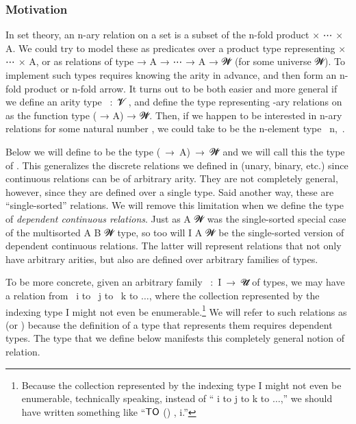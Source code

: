 \subsubsection*{Motivation} %
In set theory, an \ab n-ary relation on a set  is a subset of the \ab n-fold product  \ad × \as ⋯ \ad × \ab A. We could try to model these as predicates over a product type representing  \ad × \as ⋯ \ad × \ab A, or as relations of type  \as → \ab A \as → \as ⋯ \as → \ab A \as → \ab 𝓦\af ̇ (for some universe \ab 𝓦). To implement such types requires knowing the arity in advance, and then form an \ab n-fold product or \ab n-fold arrow. It turns out to be both easier and more general if we define an arity type ~\as :~\ab 𝓥\af ̇ , and define the type representing -ary relations on  as the function type ( \as → \ab A) \as → \ab 𝓦\af ̇. Then, if we happen to be interested in \ab n-ary relations for some natural number , we could take  to be the \ab n-element type ~\ab n,~\cite{agda-fin}.

Below we will define  to be the type (~\as →~\ab A)~\as →~\ab 𝓦\af ̇ and we will call this the type of . This generalizes the discrete relations we defined in  (unary, binary, etc.) since continuous relations can be of arbitrary arity.  They are not completely general, however, since they are defined over a single type. Said another way, these are ``single-sorted'' relations. We will remove this limitation when we define the type of \emph{dependent continuous relations}. Just as  \ab A \ab 𝓦 was the single-sorted special case of the multisorted  \ab A \ab B \ab 𝓦 type, so too will  \ab I \ab A \ab 𝓦 be the single-sorted version of dependent continuous relations. The latter will represent relations that not only have arbitrary arities, but also are defined over arbitrary families of types.

To be more concrete, given an arbitrary family ~\as :~\ab I~\as →~\ab 𝓤\af ̇ of types, we may have a relation from ~\ab i to ~\ab j to ~\ab k to $\ldots$, where the collection represented by the indexing type \ab I might not even be enumerable.\footnote{\label{uncountable}Because the collection represented by the indexing type \ab I might not even be enumerable, technically speaking, instead of `` \ab i to  \ab j to  \ab k to $\ldots$,'' we should have written something like ``$\mathsf{\af{TO}}$ () ,  \ab i.''}
We will refer to such relations as  (or ) because the definition of a type that represents them requires dependent types. The  type that we define below manifests this completely general notion of relation.

